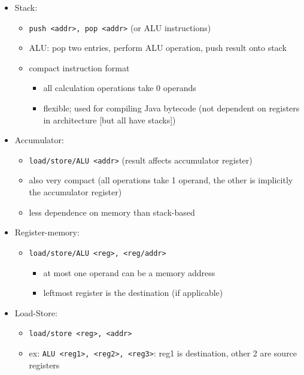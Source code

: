 \documentclass[12pt]{extarticle}
\begin{document}
	\begin{itemize}
		\item Stack:
		\begin{itemize}
			\item \texttt{push <addr>, pop <addr>} (or ALU instructions)
			\item ALU: pop two entries, perform ALU operation, push result onto stack
			\item compact instruction format
			\begin{itemize}
				\item all calculation operations take 0 operands
				\item flexible; used for compiling Java bytecode (not dependent on registers in architecture [but all 
				have stacks])
			\end{itemize}
		\end{itemize}

		\item Accumulator:
		\begin{itemize}
			\item \texttt{load/store/ALU <addr>} (result affects accumulator register)
			\item also very compact (all operations take 1 operand, the other is implicitly the accumulator register)
			\item less dependence on memory than stack-based
		\end{itemize}

		\item Register-memory:
		\begin{itemize}
			\item \texttt{load/store/ALU <reg>, <reg/addr>}
			\begin{itemize}
				\item at most one operand can be a memory address
				\item leftmost register is the destination (if applicable)
			\end{itemize}
		\end{itemize}

		\item Load-Store:
		\begin{itemize}
			\item \texttt{load/store <reg>, <addr>}
			\item ex: \texttt{ALU <reg1>, <reg2>, <reg3>}: reg1 is destination, other 2 are source registers
		\end{itemize}
	\end{itemize}
\end{document}
